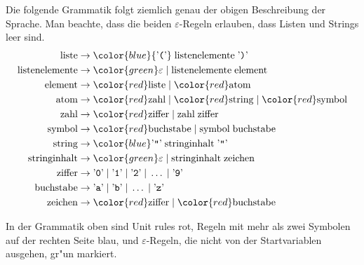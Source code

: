 \begin{loesung}
\begin{teilaufgaben}
\item Die folgende Grammatik folgt ziemlich genau der obigen Beschreibung
der Sprache. Man beachte, dass die beiden $\varepsilon$-Regeln
erlauben, dass Listen und Strings leer sind.
\begin{align*}
\text{liste}&\rightarrow {\color{blue}
{\text{'{\tt (}'}}\;
\text{listenelemente}\;
{\text{'{\tt )}'}}}
\\
\text{listenelemente}&\rightarrow {\color{green}\varepsilon} \;|\; \text{listenelemente}\;\text{element}
\\
\text{element}&\rightarrow {\color{red}\text{liste}} \;|\; {\color{red}\text{atom}}
\\
\text{atom}&\rightarrow {\color{red}\text{zahl}}\;|\;{\color{red}\text{string}}\;|\;{\color{red}\text{symbol}}
\\
\text{zahl}&\rightarrow {\color{red}\text{ziffer}}\;|\;\text{zahl}\;\text{ziffer}
\\
\text{symbol}&\rightarrow {\color{red}\text{buchstabe}} \;|\; \text{symbol}\;\text{buchstabe}
\\
\text{string}&\rightarrow {\color{blue}
\text{'{\tt\textquotedblright}'}\; \text{stringinhalt}\;
\text{'{\tt\textquotedblright}'}}
\\
\text{stringinhalt}&\rightarrow {\color{green}\varepsilon} \;|\; \text{stringinhalt}\;\text{zeichen}
\\
\text{ziffer}&\rightarrow
{\text{'{\tt 0}'}} \;|\;
{\text{'{\tt 1}'}} \;|\;
{\text{'{\tt 2}'}} \;|\;
\dots \;|\;
{\text{'{\tt 9}'}}
\\
\text{buchstabe}&\rightarrow
{\text{'{\tt a}'}} \;|\;
{\text{'{\tt b}'}} \;|\;
\dots \;|\;
{\text{'{\tt z}'}}
\\
\text{zeichen}&\rightarrow {\color{red}\text{ziffer}}\; |\; {\color{red}\text{buchstabe}}
\end{align*}
\item
In der Grammatik oben sind
Unit rules
{\color{red}
rot},
Regeln mit mehr als zwei Symbolen auf der rechten Seite
{\color{blue}
blau},
und
$\varepsilon$-Regeln, die nicht von der Startvariablen ausgehen,
{\color{green}
gr"un} markiert.
\end{teilaufgaben}

\end{loesung}
